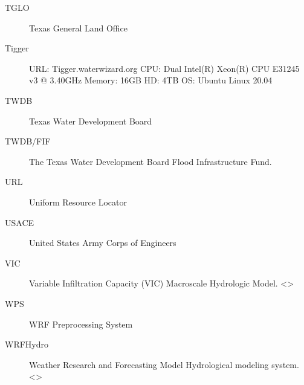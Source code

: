 \documentclass[letterpaper,12pt,english]{book}
\begin{document}
\begin{description}
\item[{TGLO\label{\detokenize{glossary:term-TGLO}}}] \leavevmode
\sphinxAtStartPar
Texas General Land Office

\item[{Tigger\label{\detokenize{glossary:term-Tigger}}}] \leavevmode
\sphinxAtStartPar
URL: Tigger.water\sphinxhyphen{}wizard.org CPU: Dual Intel(R) Xeon(R) CPU E3\sphinxhyphen{}1245 v3 @ 3.40GHz Memory: 16GB HD: 4TB OS: Ubuntu Linux 20.04

\item[{TWDB\label{\detokenize{glossary:term-TWDB}}}] \leavevmode
\sphinxAtStartPar
Texas Water Development Board

\item[{TWDB/FIF\label{\detokenize{glossary:term-TWDB-FIF}}}] \leavevmode
\sphinxAtStartPar
The Texas Water Development Board Flood Infrastructure Fund.

\item[{URL\label{\detokenize{glossary:term-URL}}}] \leavevmode
\sphinxAtStartPar
Uniform Resource Locator

\item[{USACE\label{\detokenize{glossary:term-USACE}}}] \leavevmode
\sphinxAtStartPar
United States Army Corps of Engineers

\item[{VIC\label{\detokenize{glossary:term-VIC}}}] \leavevmode
\sphinxAtStartPar
Variable Infiltration Capacity (VIC) Macroscale Hydrologic Model.  \textless{}\textgreater{}

\item[{WPS\label{\detokenize{glossary:term-WPS}}}] \leavevmode
\sphinxAtStartPar
WRF Preprocessing System

\item[{WRF\sphinxhyphen{}Hydro\label{\detokenize{glossary:term-WRF-Hydro}}}] \leavevmode
\sphinxAtStartPar
Weather Research and Forecasting Model Hydrological modeling system.   \textless{}\textgreater{}

\end{description}
\end{document}
